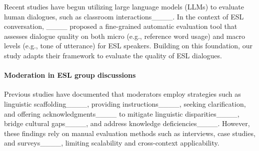 Recent studies have begun utilizing large language models (LLMs) to evaluate human dialogues, such as classroom interactions____. In the context of ESL conversation, ____ proposed a fine-grained automatic evaluation tool that assesses dialogue quality on both micro (e.g., reference word usage) and macro levels (e.g., tone of utterance) for ESL speakers. Building on this foundation, our study adapts their framework to evaluate the quality of ESL dialogues. %




\paragraph{Moderation in ESL group discussions}  


Previous studies have documented that moderators employ strategies such as linguistic scaffolding____, providing instructions____, seeking clarification, and offering acknowledgments____ to mitigate linguistic disparities____, bridge cultural gaps____, and address knowledge deficiencies____. However, these findings rely on manual evaluation methods such as interviews, case studies, and surveys____, limiting scalability and cross-context applicability.

